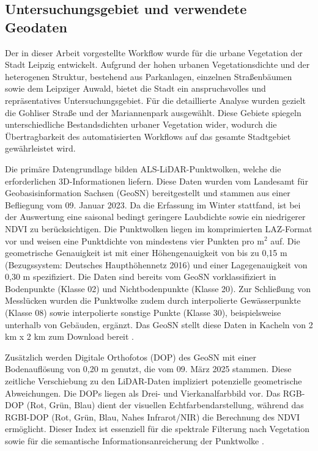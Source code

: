 \subsection {Untersuchungsgebiet und verwendete Geodaten}

Der in dieser Arbeit vorgestellte Workflow wurde für die urbane Vegetation der Stadt Leipzig entwickelt. Aufgrund der hohen urbanen Vegetationsdichte und der heterogenen Struktur, bestehend aus Parkanlagen, einzelnen Straßenbäumen sowie dem Leipziger Auwald, bietet die Stadt ein anspruchsvolles und repräsentatives Untersuchungsgebiet. Für die detaillierte Analyse wurden gezielt die Gohliser Straße und der Mariannenpark ausgewählt. Diese Gebiete spiegeln unterschiedliche Bestandsdichten urbaner Vegetation wider, wodurch die Übertragbarkeit des automatisierten Workflows auf das gesamte Stadtgebiet gewährleistet wird.

Die primäre Datengrundlage bilden ALS-LiDAR-Punktwolken, welche die erforderlichen 3D-Informationen liefern. Diese Daten wurden vom Landesamt für Geobasisinformation Sachsen (\ac{GeoSN}) bereitgestellt und stammen aus einer Befliegung vom 09. Januar 2023. Da die Erfassung im Winter stattfand, ist bei der Auswertung eine saisonal bedingt geringere Laubdichte sowie ein niedrigerer NDVI zu berücksichtigen. Die Punktwolken liegen im komprimierten LAZ-Format vor und weisen eine Punktdichte von mindestens vier Punkten pro $\text{m}^2$ auf. Die geometrische Genauigkeit ist mit einer Höhengenauigkeit von bis zu 0,15 m (Bezugssystem: Deutsches Haupthöhennetz 2016) und einer Lagegenauigkeit von 0,30 m spezifiziert. Die Daten sind bereits vom GeoSN vorklassifiziert in Bodenpunkte (Klasse 02) und Nichtbodenpunkte (Klasse 20). Zur Schließung von Messlücken wurden die Punktwolke zudem durch interpolierte Gewässerpunkte (Klasse 08) sowie interpolierte sonstige Punkte (Klasse 30), beispielsweise unterhalb von Gebäuden, ergänzt. Das GeoSN stellt diese Daten in Kacheln von 2 km x 2 km zum Download bereit \cite{zotero-item-43}.

Zusätzlich werden Digitale Orthofotos (\ac{DOP}) des GeoSN mit einer Bodenauflösung von 0,20 m genutzt, die vom 09. März 2025 stammen. Diese zeitliche Verschiebung zu den LiDAR-Daten impliziert potenzielle geometrische Abweichungen. Die DOPs liegen als Drei- und Vierkanalfarbbild vor. Das RGB-DOP (Rot, Grün, Blau) dient der visuellen Echtfarbendarstellung, während das RGBI-DOP (Rot, Grün, Blau, Nahes Infrarot/NIR) die Berechnung des NDVI ermöglicht. Dieser Index ist essenziell für die spektrale Filterung nach Vegetation sowie für die semantische Informationsanreicherung der Punktwolke \cite{zotero-item-43}.

